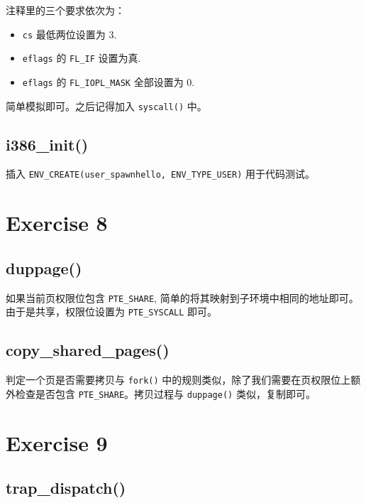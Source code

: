 \documentclass[11pt]{article}
\begin{document}
		\par 注释里的三个要求依次为：
		
		\begin{itemize}
			\item \texttt{cs} 最低两位设置为 $3$.
			\item \texttt{eflags} 的 \texttt{FL\_IF} 设置为真.
			\item \texttt{eflags} 的 \texttt{FL\_IOPL\_MASK} 全部设置为 0.
		\end{itemize}
		
		\par 简单模拟即可。之后记得加入 \texttt{syscall()} 中。
		
	\subsection*{i386\_init()}
		\par 插入 \texttt{ENV\_CREATE(user\_spawnhello, ENV\_TYPE\_USER)} 用于代码测试。
	
	\section{Exercise 8}
		
	\subsection*{duppage()}
		
		\par 如果当前页权限位包含 \texttt{PTE\_SHARE}, 简单的将其映射到子环境中相同的地址即可。由于是共享，权限位设置为 \texttt{PTE\_SYSCALL} 即可。
		
	\subsection*{copy\_shared\_pages()}
		
		\par 判定一个页是否需要拷贝与 \texttt{fork()} 中的规则类似，除了我们需要在页权限位上额外检查是否包含 \texttt{PTE\_SHARE}。拷贝过程与 \texttt{duppage()} 类似，复制即可。
		
	\section{Exercise 9}
		
	\subsection*{trap\_dispatch()}
		
\end{document}
